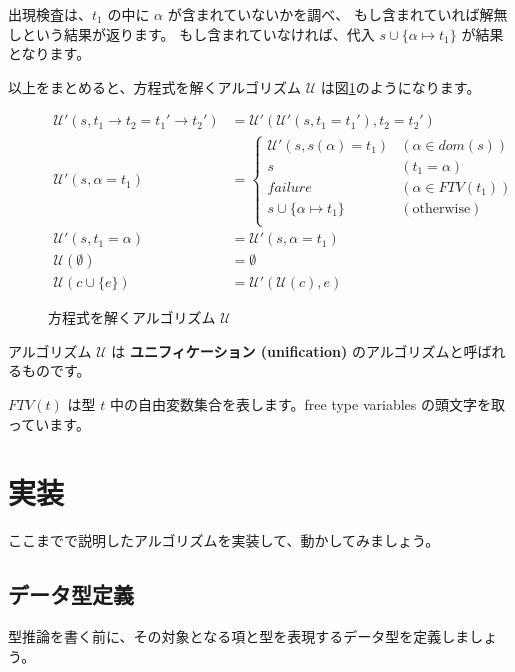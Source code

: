出現検査は、$t_1$ の中に $\alpha$ が含まれていないかを調べ、
もし含まれていれば解無しという結果が返ります。
もし含まれていなければ、代入 $s \cup \{\alpha \mapsto t_1\}$ が結果となります。

以上をまとめると、方程式を解くアルゴリズム $\mathcal U$ は図\ref{fig:algorithm-s}のようになります。

\begin{figure}[htbp]
 \begin{align*}
  \mathcal{U'}(s, t_1 \to t_2 = t_1' \to t_2') &=
   \mathcal{U'}(\mathcal{U'}(s, t_1 = t_1'), t_2 = t_2') \\
  \mathcal{U'}(s, \alpha = t_1) &=
   \left \{
    \begin{array}{ll}
     \mathcal{U'}(s, s(\alpha) = t_1) & (\alpha \in \mathit{dom}(s)) \\
     s                                & (t_1 = \alpha) \\
     \textit{failure}                 & (\alpha \in \mathit{FTV}(t_1)) \\
     s \cup \{\alpha \mapsto t_1\}    & (\text{otherwise}) \\
    \end{array}
   \right . \\
  \mathcal{U'}(s, t_1 = \alpha) &= \mathcal{U'}(s, \alpha = t_1) \\
  \mathcal{U}(\emptyset) &= \emptyset \\
  \mathcal{U}(c \cup \{e\}) &= \mathcal{U'}(\mathcal{U}(c), e)
 \end{align*}
 \caption{方程式を解くアルゴリズム $\mathcal U$}
 \label{fig:algorithm-s}
\end{figure}

アルゴリズム $\mathcal U$ は
\textbf{ユニフィケーション (unification)} のアルゴリズムと呼ばれるものです。

$\mathit{FTV}(t)$ は型 $t$ 中の自由変数集合を表します。free type variables の頭文字を取っています。

\section{実装}

ここまでで説明したアルゴリズムを実装して、動かしてみましょう。

\subsection{データ型定義}

型推論を書く前に、その対象となる項と型を表現するデータ型を定義しましょう。

